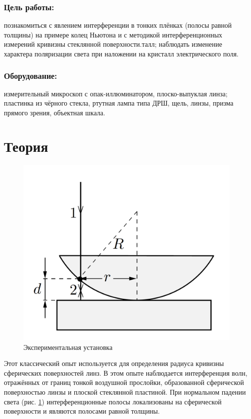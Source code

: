 \documentclass[a4paper,12pt]{article}
\begin{document}
\subsubsection*{Цель работы:} познакомиться с явлением интерференции в тонких плёнках (полосы равной толщины) на примере колец Ньютона и с методикой интерференционных измерений кривизны стеклянной поверхности.талл; наблюдать изменение характера поляризации света при наложении на кристалл электрического поля.

\subsubsection*{Оборудование:} измерительный микроскоп с опак-иллюминатором, плоско-выпуклая линза; пластинка из чёрного стекла, ртутная лампа типа ДРШ, щель, линзы, призма прямого зрения, объектная шкала.

\section*{Теория}

\begin{figure} 
	\includegraphics[width=\linewidth]{ring}
	\caption{Экспериментальная установка}
	\label{ring}
\end{figure}

Этот классический опыт используется для определения радиуса кривизны сферических поверхностей линз. В этом опыте наблюдается интерференция волн, отражённых от границ тонкой воздушной прослойки, образованной сферической поверхностью линзы и плоской стеклянной пластиной. При нормальном падении света (рис. \ref{ring}) интерференционные полосы локализованы на сферической поверхности и являются полосами равной толщины.
\end{document}
